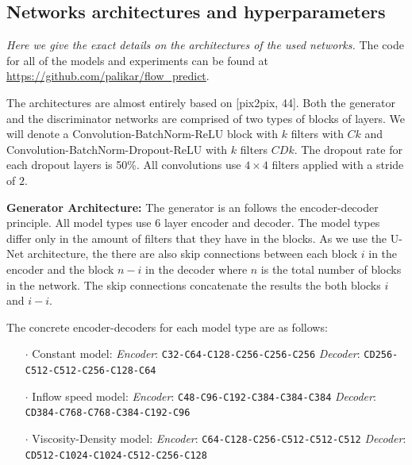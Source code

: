 \documentclass{llncs}
\begin{document}
\begin{subappendices}
\renewcommand{\thesection}{\Alph{section}}%

\section{Networks architectures and hyperparameters}
\emph{Here we give the exact details on the architectures of the used networks.}
The code for all of the models and experiments can be found at \url{https://github.com/palikar/flow_predict}.

The architectures are almost entirely based on [pix2pix, 44]. Both the generator and the discriminator networks are comprised of two types of blocks of layers. We will denote a Convolution-BatchNorm-ReLU block with $k$ filters with $Ck$ and Convolution-BatchNorm-Dropout-ReLU with $k$ filters $CDk$. The dropout rate for each dropout layers is 50\%. All convolutions use $4\times4$ filters applied with a stride of $2$.

\noindent\textbf{Generator Architecture:}
The generator is an follows the encoder-decoder principle. All model types use 6 layer encoder and decoder. The model types differ only in the amount of filters that they have in the blocks. As we use the U-Net architecture, the there are also skip connections between each block $i$ in the encoder and the block $n-i$ in the decoder where $n$ is the total number of blocks in the network. The skip connections concatenate the results the both blocks $i$ and $i-i$.

The concrete encoder-decoders for each model type are as follows:
\begin{itemize}
\item[$\cdot$] Constant model:\newline
  \emph{Encoder}: \texttt{C32-C64-C128-C256-C256-C256}\newline
  \emph{Decoder}: \texttt{CD256-C512-C512-C256-C128-C64}
\item[$\cdot$] Inflow speed model:\newline
  \emph{Encoder}: \texttt{C48-C96-C192-C384-C384-C384}\newline
  \emph{Decoder}: \texttt{CD384-C768-C768-C384-C192-C96}
\item[$\cdot$] Viscosity-Density model:\newline
  \emph{Encoder}: \texttt{C64-C128-C256-C512-C512-C512} \newline
  \emph{Decoder}: \texttt{CD512-C1024-C1024-C512-C256-C128}
\end{itemize}


\end{subappendices}
\end{document}
